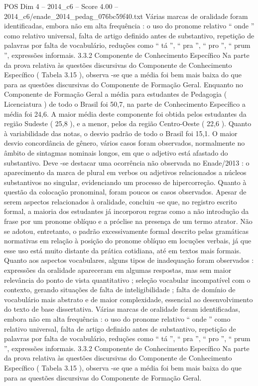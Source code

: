 \begin{textsample}{POS Dim 4 – 2014\_c6 – Score 4.00 – 2014\_c6/enade\_2014\_pedag\_076bc59f40.txt}
Várias marcas de oralidade foram identificadas, embora não em alta frequência : o uso do pronome relativo “ onde ” como relativo universal, falta de artigo definido antes de substantivo, repetição de palavras por falta de vocabulário, reduções como “ tá ”, “ pra ”, “ pro ”, “ prum ”, expressões informais. 3.3.2 Componente de Conhecimento Específico Na parte da prova relativa às questões discursivas do Componente de Conhecimento Específico ( Tabela 3.15 ), observa -se que a média foi bem mais baixa do que para as questões discursivas do Componente de Formação Geral.
Enquanto no Componente de Formação Geral a média para estudantes de Pedagogia ( Licenciatura ) de todo o Brasil foi 50,7, na parte de Conhecimento Específico a média foi 24,6.
A maior média deste componente foi obtida pelos estudantes da região Sudeste ( 25,8 ), e a menor, pelos da região Centro-Oeste ( 22,6 ).
Quanto à variabilidade das notas, o desvio padrão de todo o Brasil foi 15,1.
O maior desvio concordância de gênero, vários casos foram observados, normalmente no âmbito de sintagmas nominais longos, em que o adjetivo está afastado do substantivo.
Deve -se destacar uma ocorrência não observada no Enade/2013 : o aparecimento da marca de plural em verbos ou adjetivos relacionados a núcleos substantivos no singular, evidenciando um processo de hipercorreção.
Quanto à questão da colocação pronominal, foram poucos os casos observados.
Apesar de serem aspectos relacionados à oralidade, concluiu -se que, no registro escrito formal, a maioria dos estudantes já incorporou regras como a não introdução da frase por um pronome oblíquo e a próclise na presença de um termo atrator.
Não se adotou, entretanto, o padrão excessivamente formal descrito pelas gramáticas normativas em relação à posição do pronome oblíquo em locuções verbais, já que esse uso está muito distante da prática cotidiana, até em textos mais formais.
Quanto aos aspectos vocabulares, alguns tipos de inadequação foram observados : expressões da oralidade apareceram em algumas respostas, mas sem maior relevância do ponto de vista quantitativo ; seleção vocabular incompatível com o contexto, gerando situações de falta de inteligibilidade ; falta de domínio de vocabulário mais abstrato e de maior complexidade, essencial ao desenvolvimento do texto de base dissertativa.
Várias marcas de oralidade foram identificadas, embora não em alta frequência : o uso do pronome relativo “ onde ” como relativo universal, falta de artigo definido antes de substantivo, repetição de palavras por falta de vocabulário, reduções como “ tá ”, “ pra ”, “ pro ”, “ prum ”, expressões informais. 3.3.2 Componente de Conhecimento Específico Na parte da prova relativa às questões discursivas do Componente de Conhecimento Específico ( Tabela 3.15 ), observa -se que a média foi bem mais baixa do que para as questões discursivas do Componente de Formação Geral.

\end{textsample}
